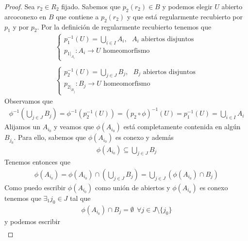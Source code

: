 \begin{prop}
\begin{proof}
        Sea $r_2\in R_2$ fijado. Sabemos que $p_2(r_2)\in B$ y podemos elegir $U$ abierto arcoconexo en $B$ que contiene a $p_2(r_2)$ y que está regularmente recubierto por $p_1$ y por $p_2$. Por la definición de regularmente recubierto tenemos que 
        \begin{gather*}
            \left\{
                \begin{array}{l}
                    p_1^{-1}(U) = \bigcup\limits_{i\in I}A_i,\ \ \ A_i \text{ abiertos disjuntos}\\
                    p_{1|_{A_i}} : A_i \to U \text{ homeomorfismo}
                \end{array}  
            \right.\\\\
            \left\{
                \begin{array}{l}
                    p_2^{-1}(U) = \bigcup\limits_{j\in J}B_j,\ \ \ B_j \text{ abiertos disjuntos}\\
                    p_{2|_{B_j}} : B_j \to U \text{ homeomorfismo}
                \end{array}  
            \right.
        \end{gather*}
        Observamos que
        \begin{gather*}
            \phi^{-1}\left(\bigcup\limits_{j\in J}B_j\right) = \phi^{-1}(p_2^{-1}(U)) = (p_2 \circ \phi)^{-1}(U) = p_1^{-1}(U) = \bigcup\limits_{i\in I} A_i
        \end{gather*}
        Alijamos un $A_{i_0}$ y veamos que $\phi(A_{i_0})$ está completamente contenida en algún $B_{j_0}$. Para ello, sabemos que $\phi(A_{i_0})$ es conexo y además
        \begin{gather*}
            \phi(A_{i_0}) \subseteq \bigcup\limits_{j\in J} B_j
        \end{gather*}
        Tenemos entonces que 
        \begin{gather*}
            \phi(A_{i_0}) = \phi(A_{i_0}) \cap \left(\bigcup\limits_{j\in J}B_j\right) = \bigcup\limits_{j\in J}(\phi(A_{i_0}) \cap B_j)
        \end{gather*}
        Como puedo escribir $\phi(A_{i_0})$ como unión de abiertos y $\phi(A_{i_0})$ es conexo tenemos que $\exists_1 j_0\in J$ tal que 
        \begin{gather*}
            \phi(A_{i_0}) \cap B_j = \emptyset \ \ \forall j \in J\setminus \{j_0\}
        \end{gather*}
        y podemos escribir 
        \begin{gather*}

\end{gather*}
\end{proof}
\end{prop}
